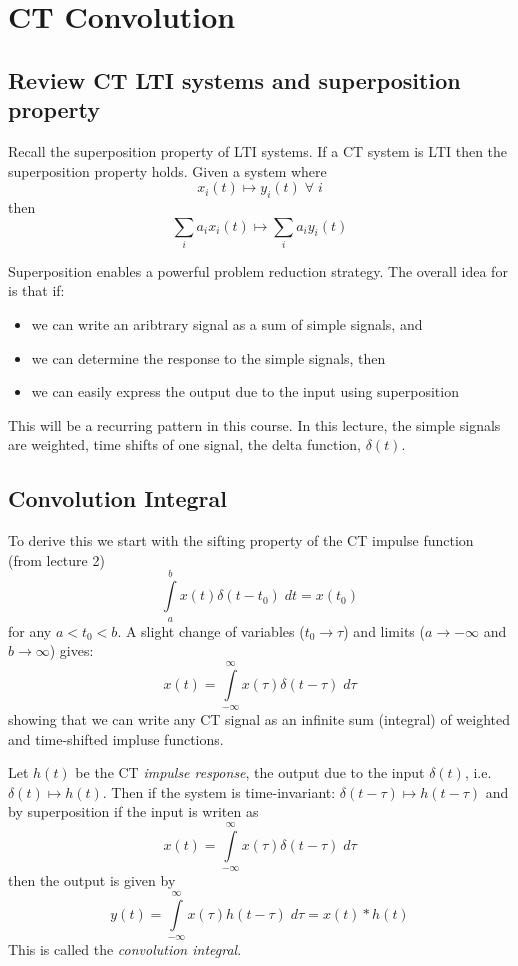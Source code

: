\section{CT Convolution}

\subsection{Review CT LTI systems and superposition property}

Recall the superposition property of LTI systems. If a CT system is LTI then the superposition property holds. Given a system where
\[   
x_i(t) \mapsto y_i(t) \; \forall\; i
\]
then
\[
\sum\limits_{i} a_i x_i(t) \mapsto \sum\limits_{i} a_i y_i(t) 
\]

Superposition enables a powerful problem reduction strategy. The overall idea for is that if:

\begin{itemize}
\item we can write an aribtrary signal as a sum of simple signals, and 
\item we can determine the response to the simple signals, then
\item we can easily express the output due to the input using superposition
\end{itemize}

This will be a recurring pattern in this course. In this lecture, the simple signals are weighted, time shifts of one signal, the delta function, $\delta(t)$.

\subsection{Convolution Integral}

To derive this we start with the sifting property of the CT impulse function (from lecture 2)
\[
\int\limits_{a}^{b} x(t)\delta(t-t_0) \; dt = x(t_0)
\]
for any $a < t_0 < b$. A slight change of variables ($t_0 \rightarrow \tau$) and limits ($a \rightarrow -\infty$ and $b \rightarrow \infty$) gives:
\[
x(t) = \int\limits_{-\infty}^{\infty} x(\tau)\delta(t-\tau) \; d\tau
\]
showing that we can write any CT signal as an infinite sum (integral) of weighted and time-shifted impluse functions.

Let $h(t)$ be the CT {\it impulse response}, the output due to the input $\delta(t)$, i.e. $\delta(t) \mapsto h(t)$. Then if the system is time-invariant: $\delta(t-\tau) \mapsto h(t-\tau)$ and by superposition if the input is writen as
\[
x(t) = \int\limits_{-\infty}^{\infty} x(\tau)\delta(t-\tau) \; d\tau
\]
then the output is given by
\[
  y(t) = \int\limits_{-\infty}^{\infty} x(\tau)h(t-\tau) \; d\tau = x(t) * h(t)
\]
This is called the \emph{convolution integral}.

